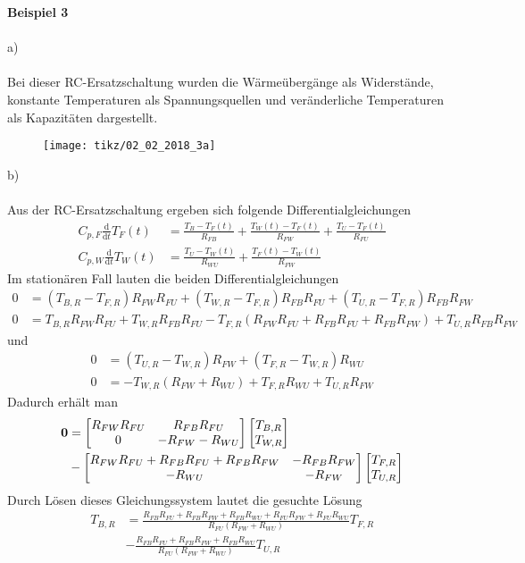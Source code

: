 \textbf{Beispiel 3}\\ \\
a)\\ \\
Bei dieser RC-Ersatzschaltung wurden die Wärmeübergänge als Widerstände, konstante Temperaturen als Spannungsquellen
und veränderliche Temperaturen als Kapazitäten dargestellt.
\begin{figure}[h]
	\centering
	\texttt{[image: tikz/02\_02\_2018\_3a]}
\end{figure}
\newline
b)\\ \\
Aus der RC-Ersatzschaltung ergeben sich folgende Differentialgleichungen
\begin{align*}
	C_{p,F}\frac{\text{d}}{\text{d}t}T_F(t) &= \frac{T_B - T_F(t)}{R_{FB}} + \frac{T_W(t) - T_{F}(t)}{R_{FW}} + \frac{T_U - T_F(t)}{R_{FU}} \\
	C_{p,W}\frac{\text{d}}{\text{d}t}T_W(t) &= \frac{T_U - T_W(t)}{R_{WU}} + \frac{T_F(t) - T_W(t)}{R_{FW}}
\end{align*}
\newpage
\noindent
Im stationären Fall lauten die beiden Differentialgleichungen
\begin{align*}
	0 &= (T_{B,R} - T_{F,R})R_{FW}R_{FU} + (T_{W,R} - T_{F,R})R_{FB}R_{FU} + (T_{U,R} - T_{F,R})R_{FB}R_{FW} \\
	0 &= T_{B,R}R_{FW}R_{FU} + T_{W,R}R_{FB}R_{FU} - T_{F,R}(R_{FW}R_{FU} + R_{FB}R_{FU} + R_{FB}R_{FW}) + T_{U,R}R_{FB}R_{FW}
\end{align*}
und
\begin{align*}
	0 &= (T_{U,R} -  T_{W,R})R_{FW} + (T_{F,R} - T_{W,R})R_{WU} \\
	0&= -T_{W,R}(R_{FW} + R_{WU}) + T_{F,R}R_{WU} + T_{U,R}R_{FW}
\end{align*}
Dadurch erhält man
\begin{align*}
	\textbf{\text{0}} &= \begin{bmatrix}
		R_{FW}R_{FU} & R_{FB}R_{FU} \\
		0 & -R_{FW} - R_{WU}
	\end{bmatrix}
	\begin{bmatrix}
		T_{B,R} \\
		T_{W,R}
	\end{bmatrix} \\
	&-
	\begin{bmatrix}
		R_{FW}R_{FU} + R_{FB}R_{FU} + R_{FB}R_{FW} & -R_{FB}R_{FW} \\
		-R_{WU} & -R_{FW}
	\end{bmatrix}
	\begin{bmatrix}
		T_{F,R} \\
		T_{U,R}
	\end{bmatrix}
\end{align*}
Durch Lösen dieses Gleichungssystem lautet die gesuchte Lösung
\begin{align*}
	T_{B,R} &= \frac{R_{FB}R_{FU} + R_{FB}R_{FW} + R_{FB}R_{WU} + R_{FU}R_{FW} + R_{FU}R_{WU}}{R_{FU}(R_{FW} + R_{WU})}T_{F,R} \\
	&- \frac{R_{FB}R_{FU} + R_{FB}R_{FW} + R_{FB}R_{WU}}{R_{FU}(R_{FW} + R_{WU})}T_{U,R}
\end{align*}